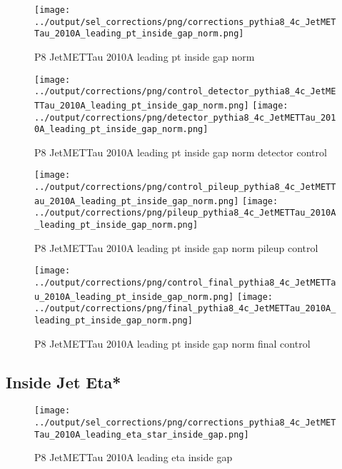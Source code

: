 \documentclass[11pt]{book}
\begin{document}
\begin{figure}[ht]
\centering
\texttt{[image: ../output/sel\_corrections/png/corrections\_pythia8\_4c\_JetMETTau\_2010A\_leading\_pt\_inside\_gap\_norm.png]}
\caption{P8 JetMETTau 2010A leading pt inside gap norm}
\label{fig:p8_JetMETTau_2010A_leading_pt_inside_gap_norm}
\end{figure}

\begin{figure}[ht]
\centering
\texttt{[image: ../output/corrections/png/control\_detector\_pythia8\_4c\_JetMETTau\_2010A\_leading\_pt\_inside\_gap\_norm.png]}
\texttt{[image: ../output/corrections/png/detector\_pythia8\_4c\_JetMETTau\_2010A\_leading\_pt\_inside\_gap\_norm.png]}
\caption{P8 JetMETTau 2010A leading pt inside gap norm detector control}
\label{fig:p8_JetMETTau_2010A_leading_pt_inside_gap_norm_detector_control}
\end{figure}

\begin{figure}[ht]
\centering
\texttt{[image: ../output/corrections/png/control\_pileup\_pythia8\_4c\_JetMETTau\_2010A\_leading\_pt\_inside\_gap\_norm.png]}
\texttt{[image: ../output/corrections/png/pileup\_pythia8\_4c\_JetMETTau\_2010A\_leading\_pt\_inside\_gap\_norm.png]}
\caption{P8 JetMETTau 2010A leading pt inside gap norm pileup control}
\label{fig:p8_JetMETTau_2010A_leading_pt_inside_gap_norm_pileup_control}
\end{figure}


\begin{figure}[ht]
\centering
\texttt{[image: ../output/corrections/png/control\_final\_pythia8\_4c\_JetMETTau\_2010A\_leading\_pt\_inside\_gap\_norm.png]}
\texttt{[image: ../output/corrections/png/final\_pythia8\_4c\_JetMETTau\_2010A\_leading\_pt\_inside\_gap\_norm.png]}
\caption{P8 JetMETTau 2010A leading pt inside gap norm final control}
\label{fig:p8_JetMETTau_2010A_leading_pt_inside_gap_norm_final_control}
\end{figure}


\clearpage
\subsection{Inside Jet Eta*}
\begin{figure}[ht]
\centering
\texttt{[image: ../output/sel\_corrections/png/corrections\_pythia8\_4c\_JetMETTau\_2010A\_leading\_eta\_star\_inside\_gap.png]}
\caption{P8 JetMETTau 2010A leading eta inside gap}
\label{fig:p8_JetMETTau_2010A_leading_eta_star_inside_gap}
\end{figure}
\end{document}

